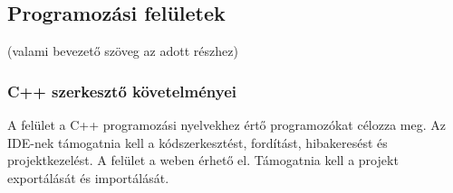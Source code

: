 \documentclass{article}
\begin{document}
\subsection{Programozási felületek}

(valami bevezető szöveg az adott részhez)

\subsubsection{C++ szerkesztő követelményei}

A felület a C++ programozási nyelvekhez értő programozókat célozza meg. Az IDE-nek támogatnia kell a kódszerkesztést, fordítást, hibakeresést és projektkezelést. A felület a weben érhető el. Támogatnia kell a projekt exportálását és importálását.

\begingroup
\centering
\end{document}
